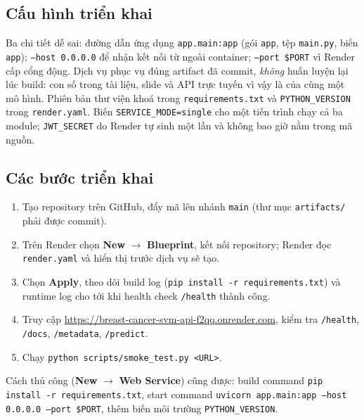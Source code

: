 \documentclass[12pt]{article}
\begin{document}
\subsection{Cấu hình triển khai}


Ba chi tiết dễ sai: đường dẫn ứng dụng \texttt{app.main:app} (gói \texttt{app}, tệp \texttt{main.py}, biến
\texttt{app}); \texttt{--host 0.0.0.0} để nhận kết nối từ ngoài container; \texttt{--port \$PORT} vì Render cấp cổng
động. Dịch vụ phục vụ đúng artifact đã commit, \emph{không} huấn luyện lại lúc build: con số trong tài liệu, slide và
API trực tuyến vì vậy là của cùng một mô hình. Phiên bản thư viện khoá trong \texttt{requirements.txt} và
\texttt{PYTHON\_VERSION} trong \texttt{render.yaml}. Biến \texttt{SERVICE\_MODE=single} cho một tiến trình chạy cả ba
module; \texttt{JWT\_SECRET} do Render tự sinh một lần và không bao giờ nằm trong mã nguồn.

\subsection{Các bước triển khai}
\begin{enumerate}
  \item Tạo repository trên GitHub, đẩy mã lên nhánh \texttt{main} (thư mục \texttt{artifacts/} phải được commit).
  \item Trên Render chọn \textbf{New} $\rightarrow$ \textbf{Blueprint}, kết nối repository; Render đọc
        \texttt{render.yaml} và hiển thị trước dịch vụ sẽ tạo.
  \item Chọn \textbf{Apply}, theo dõi build log (\texttt{pip install -r requirements.txt}) và runtime log cho tới khi
        health check \texttt{/health} thành công.
  \item Truy cập \url{https://breast-cancer-svm-api-f2qq.onrender.com}, kiểm tra \texttt{/health}, \texttt{/docs},
        \texttt{/metadata}, \texttt{/predict}.
  \item Chạy \texttt{python scripts/smoke\_test.py <URL>}.
\end{enumerate}
Cách thủ công (\textbf{New} $\rightarrow$ \textbf{Web Service}) cũng được: build command
\texttt{pip install -r requirements.txt}, start command
\texttt{uvicorn app.main:app --host 0.0.0.0 --port \$PORT}, thêm biến môi trường \texttt{PYTHON\_VERSION}.
\end{document}
